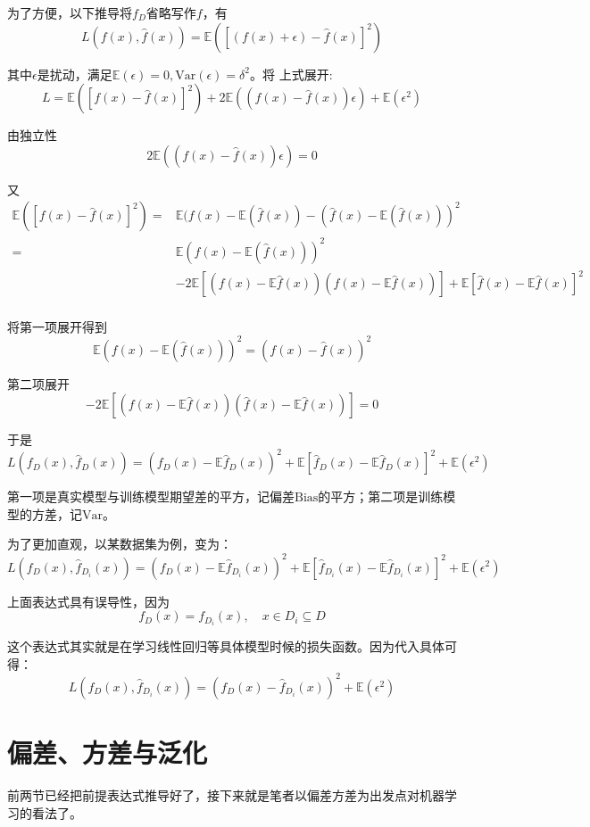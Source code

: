 \documentclass{article}
\begin{document}
    为了方便，以下推导将$f_D$省略写作$f$，有
    \[L(f(x),\widehat{f}(x))=\mathbb{E}([(f(x)+\epsilon )-\widehat{f}(x)]^2)\]

    其中$\epsilon$是扰动，满足$\mathbb{E}(\epsilon)=0,\mathrm{Var}(\epsilon)=\delta^2$。将
    上式展开:
    \[L=\mathbb{E}([f(x)-\widehat{f}(x)]^2)+2\mathbb{E}((f(x)-\widehat{f}(x))\epsilon)+\mathbb{E}(\epsilon ^2)\]

    由独立性
    \[2\mathbb{E}((f(x)-\widehat{f}(x))\epsilon)=0\]

    又
    \begin{align*}
        \mathbb{E}([f(x)-\widehat{f}(x)]^2)=&\mathbb{E}(f(x)-\mathbb{E}(\widehat{f}(x))-(\widehat{f}(x)-\mathbb{E}(\widehat{f}(x)))^2\\
        =&\mathbb{E}(f(x)-\mathbb{E}(\widehat{f}(x)))^2\\&-2\mathbb{E}[(f(x)-\mathbb{E}\widehat{f}(x))(\widehat{f}(x)-\mathbb{E}\widehat{f}(x))]+\mathbb{E}[\widehat{f}(x)-\mathbb{E}\widehat{f}(x)]^2\\
    \end{align*}
    
    将第一项展开得到
    \[\mathbb{E}(f(x)-\mathbb{E}(\widehat{f}(x)))^2=(f(x)-\widehat{f}(x))^2\]

    第二项展开
    \[-2\mathbb{E}[(f(x)-\mathbb{E}\widehat{f}(x))(\widehat{f}(x)-\mathbb{E}\widehat{f}(x))]=0\]

    于是
    \[L(f_D(x),\widehat{f}_D(x))=(f_D(x)-\mathbb{E}\widehat{f}_D(x))^2+\mathbb{E}[\widehat{f}_D(x)-\mathbb{E}\widehat{f}_D(x)]^2+\mathbb{E}(\epsilon^2)\]

    第一项是真实模型与训练模型期望差的平方，记偏差$\text{Bias}$的平方；第二项是训练模型的方差，记$\text{Var}$。

    为了更加直观，以某数据集为例，变为：
    \[L(f_D(x),\widehat{f}_{D_i}(x))=(f_D(x)-\mathbb{E}\widehat{f}_{D_i}(x))^2+\mathbb{E}[\widehat{f}_{D_i}(x)-\mathbb{E}\widehat{f}_{D_i}(x)]^2+\mathbb{E}(\epsilon^2)\]
    
    上面表达式具有误导性，因为
    \[f_D(x)=f_{D_i}(x),\quad x\in D_i \subseteq D\]
    
    这个表达式其实就是在学习线性回归等具体模型时候的损失函数。因为代入具体可得：
    \[L(f_D(x),\widehat{f}_{D_i}(x))=(f_D(x)-\widehat{f}_{D_i}(x))^2+\mathbb{E}(\epsilon^2)\]

    \section{偏差、方差与泛化}
    前两节已经把前提表达式推导好了，接下来就是笔者以偏差方差为出发点对机器学习的看法了。
\end{document}

